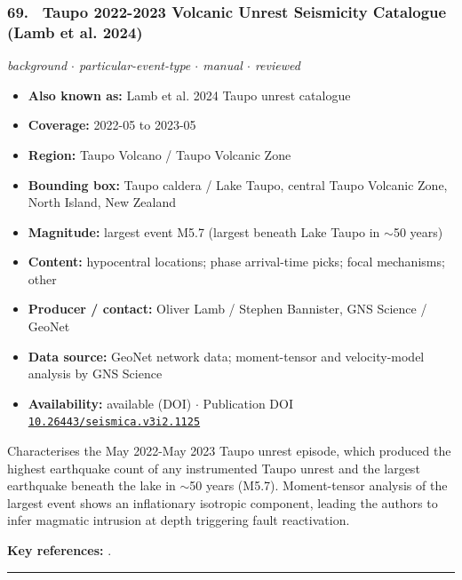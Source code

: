\documentclass[10pt,a4paper]{article}
\newcommand{\catentryrule}{\par\vspace{3pt}\noindent\textcolor{rulegrey}{\rule{\linewidth}{0.3pt}}\par\vspace{5pt}}
\newcommand{\kv}[2]{\item \textbf{#1:} #2}
\begin{document}
\subsubsection*{\hypertarget{c:69}{69.}~ Taupo 2022-2023 Volcanic Unrest Seismicity Catalogue (Lamb et al. 2024)}
{\small\itshape background $\cdot$ particular-event-type $\cdot$ manual $\cdot$ reviewed}\par\vspace{2pt}
\begin{itemize}[leftmargin=1.3em,itemsep=0.6pt,topsep=1pt,parsep=0pt]
\kv{Also known as}{Lamb et al. 2024 Taupo unrest catalogue}
\kv{Coverage}{2022-05 to 2023-05}
\kv{Region}{Taupo Volcano / Taupo Volcanic Zone}
\kv{Bounding box}{Taupo caldera / Lake Taupo, central Taupo Volcanic Zone, North Island, New Zealand}
\kv{Magnitude}{largest event M5.7 (largest beneath Lake Taupo in $\sim$50 years)}
\kv{Content}{hypocentral locations; phase arrival-time picks; focal mechanisms; other}
\kv{Producer / contact}{Oliver Lamb / Stephen Bannister, GNS Science / GeoNet}
\kv{Data source}{GeoNet network data; moment-tensor and velocity-model analysis by GNS Science}
\kv{Availability}{available (DOI) $\cdot$ Publication DOI \href{https://doi.org/10.26443/seismica.v3i2.1125}{\nolinkurl{10.26443/seismica.v3i2.1125}}}
\end{itemize}
\par\vspace{2pt}Characterises the May 2022-May 2023 Taupo unrest episode, which produced the highest earthquake count of any instrumented Taupo unrest and the largest earthquake beneath the lake in $\sim$50 years (M5.7). Moment-tensor analysis of the largest event shows an inflationary isotropic component, leading the authors to infer magmatic intrusion at depth triggering fault reactivation.
\par\vspace{2pt}\textbf{Key references:} \cite{Lamb2024}.
\catentryrule
\end{document}
